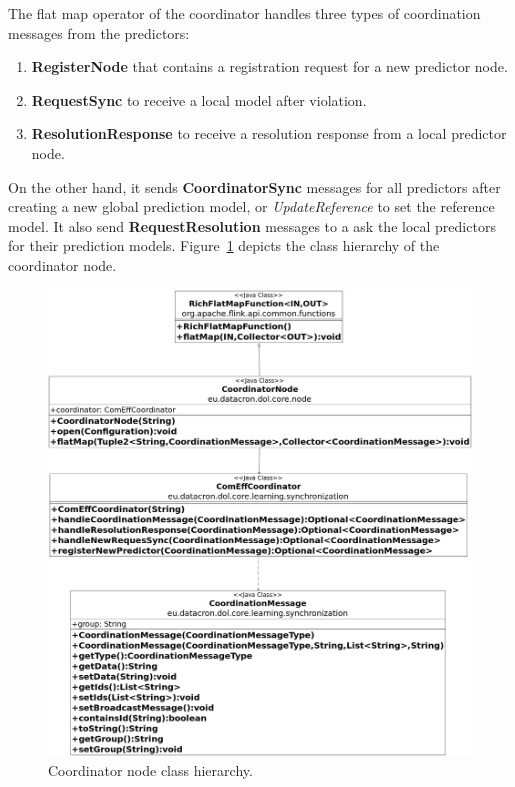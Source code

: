 The flat map operator of the coordinator handles three types of coordination messages from the predictors: \begin{enumerate}[]
	\item \textbf{RegisterNode} that contains a registration request for a new predictor node.
	\item \textbf{RequestSync} to receive a local model after violation.
	\item \textbf{ResolutionResponse} to receive a resolution response from a local predictor node.  
\end{enumerate}  

 On the other hand, it sends \textbf{CoordinatorSync} messages for all predictors after creating a new global prediction model, or \textit{UpdateReference} to set the reference model. It also send  \textbf{RequestResolution} messages to a ask the local predictors for their prediction models. Figure~\ref{fig:coord_class_diagram} depicts the  class hierarchy of the coordinator node.
 
 \begin{figure}[H]
	\centering
	\includegraphics[width=\textwidth,height=\linewidth]{chapters/figures/coordinator_diagram.png}
	
	\caption{Coordinator node class hierarchy.}
	\label{fig:coord_class_diagram}
\end{figure}